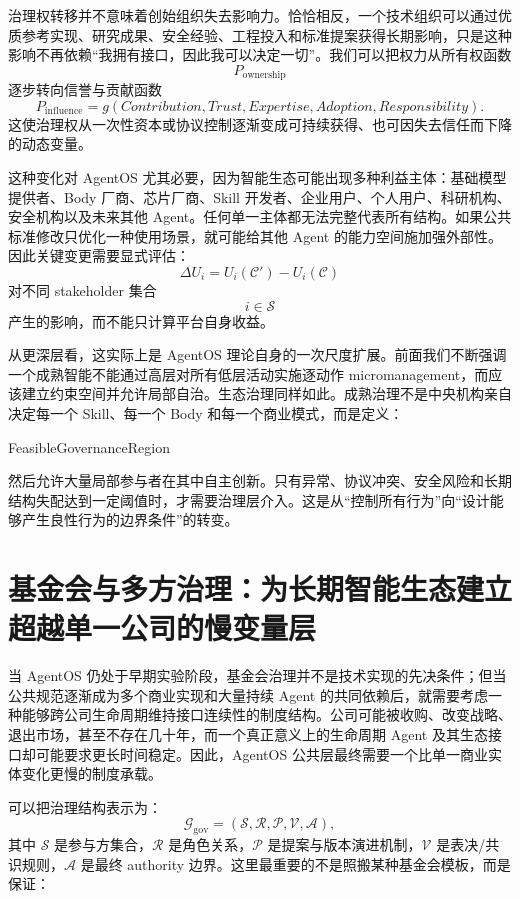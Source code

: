 治理权转移并不意味着创始组织失去影响力。恰恰相反，一个技术组织可以通过优质参考实现、研究成果、安全经验、工程投入和标准提案获得长期影响，只是这种影响不再依赖``我拥有接口，因此我可以决定一切''。我们可以把权力从所有权函数
\[
P_{\mathrm{ownership}}
\]
逐步转向信誉与贡献函数
\[
P_{\mathrm{influence}}
=
g(
Contribution,
Trust,
Expertise,
Adoption,
Responsibility
).
\]
这使治理权从一次性资本或协议控制逐渐变成可持续获得、也可因失去信任而下降的动态变量。

这种变化对 AgentOS 尤其必要，因为智能生态可能出现多种利益主体：基础模型提供者、Body 厂商、芯片厂商、Skill 开发者、企业用户、个人用户、科研机构、安全机构以及未来其他 Agent。任何单一主体都无法完整代表所有结构。如果公共标准修改只优化一种使用场景，就可能给其他 Agent 的能力空间施加强外部性。因此关键变更需要显式评估：
\[
\Delta U_i
=
U_i(\mathcal C')
-
U_i(\mathcal C)
\]
对不同 stakeholder 集合
\[
i\in\mathcal S
\]
产生的影响，而不能只计算平台自身收益。

从更深层看，这实际上是 AgentOS 理论自身的一次尺度扩展。前面我们不断强调一个成熟智能不能通过高层对所有低层活动实施逐动作 micromanagement，而应该建立约束空间并允许局部自治。生态治理同样如此。成熟治理不是中央机构亲自决定每一个 Skill、每一个 Body 和每一个商业模式，而是定义：
\begin{statementbox}
FeasibleGovernanceRegion
\end{statementbox}
然后允许大量局部参与者在其中自主创新。只有异常、协议冲突、安全风险和长期结构失配达到一定阈值时，才需要治理层介入。这是从``控制所有行为''向``设计能够产生良性行为的边界条件''的转变。

\section{基金会与多方治理：为长期智能生态建立超越单一公司的慢变量层}

当 AgentOS 仍处于早期实验阶段，基金会治理并不是技术实现的先决条件；但当公共规范逐渐成为多个商业实现和大量持续 Agent 的共同依赖后，就需要考虑一种能够跨公司生命周期维持接口连续性的制度结构。公司可能被收购、改变战略、退出市场，甚至不存在几十年，而一个真正意义上的生命周期 Agent 及其生态接口却可能要求更长时间稳定。因此，AgentOS 公共层最终需要一个比单一商业实体变化更慢的制度承载。

可以把治理结构表示为：
\[
\mathcal G_{\mathrm{gov}}
=
(
\mathcal S,
\mathcal R,
\mathcal P,
\mathcal V,
\mathcal A
),
\]
其中 $\mathcal S$ 是参与方集合，$\mathcal R$ 是角色关系，$\mathcal P$ 是提案与版本演进机制，$\mathcal V$ 是表决/共识规则，$\mathcal A$ 是最终 authority 边界。这里最重要的不是照搬某种基金会模板，而是保证：
\begin{statementbox}
\centering
{}
\end{statementbox}

